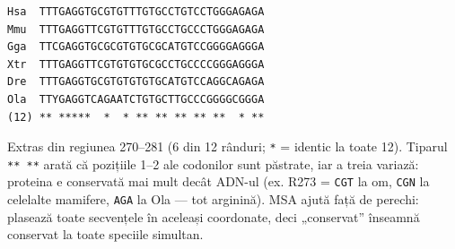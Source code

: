 \documentclass[10pt,a4paper]{article}
\begin{document}
\begin{minipage}[t]{0.47\textwidth}\vspace{0pt}
\begin{Verbatim}[fontsize=\scriptsize]
Hsa  TTTGAGGTGCGTGTTTGTGCCTGTCCTGGGAGAGA
Mmu  TTTGAGGTTCGTGTTTGTGCCTGCCCTGGGAGAGA
Gga  TTCGAGGTGCGCGTGTGCGCATGTCCGGGGAGGGA
Xtr  TTTGAGGTTCGTGTGTGCGCCTGCCCCGGGAGGGA
Dre  TTTGAGGTGCGTGTGTGTGCATGTCCAGGCAGAGA
Ola  TTYGAGGTCAGAATCTGTGCTTGCCCGGGGCGGGA
(12) ** *****  *  * ** ** ** ** **  * **
\end{Verbatim}
\end{minipage}\hfill
\begin{minipage}[t]{0.51\textwidth}\vspace{0pt}\raggedright
\footnotesize Extras din regiunea 270–281 (6 din 12 rânduri; \texttt{*} = identic la toate 12). Tiparul \texttt{** **} arată că pozițiile 1–2 ale codonilor sunt păstrate, iar a treia variază: proteina e conservată mai mult decât ADN-ul (ex. R273 = \texttt{CGT} la om, \texttt{CGN} la celelalte mamifere, \texttt{AGA} la Ola — tot arginină).
MSA ajută față de perechi: plasează toate secvențele în aceleași coordonate, deci „conservat” înseamnă conservat la toate speciile simultan.
\end{minipage}
\end{document}
